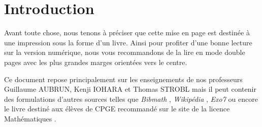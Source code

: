 \part{Introduction}

\def\arraystretch{1.5}
\par Avant toute chose, nous tenons à préciser que cette mise en page est destinée à une impression sous la forme d'un livre. Ainsi pour profiter d'une bonne lecture sur la version numérique, nous vous recommandons de la lire en mode \og double pages \fg avec les plus grandes marges orientées vers le centre. 
\\
\par \noindent Ce document repose principalement sur les enseignements de nos professeurs Guillaume AUBRUN, Kenji IOHARA et Thomas STROBL
mais il peut contenir des formulations d'autres sources telles que \emph{Bibmath} \cite{bibmath}, \emph{Wikipédia} \cite{wikipedia}, \emph{Exo7} \cite{exo7} ou encore le livre destiné aux élèves de CPGE recommandé sur le site de la licence Mathématiques \cite{livre_prepa}.

